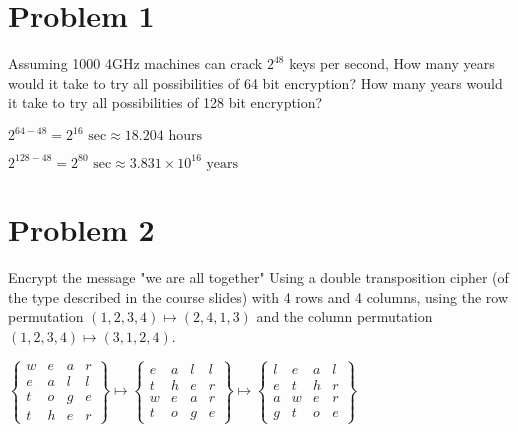 \documentclass{article}
\newenvironment{problem}[1]{
  \nobreak\section*{Problem #1}
}{}
\begin{document}
  \begin{problem}{1}
    Assuming 1000 4GHz machines can crack $2^{48}$ keys per second, How 
    many years would it take to try all possibilities of 64 bit encryption?
    How many years would it take to try all possibilities of 128 bit encryption?
    
    \begin{center}
      \begin{math}
        2^{64-48}=2^{16} \text{ sec} \approx 18.204 \text{ hours}
      \end{math}
    \end{center}
    \begin{center}
      \begin{math}
        2^{128-48}=2^{80} \text{ sec} \approx 3.831 \times 10^{16} \text{ years}
      \end{math}
    \end{center}
  \end{problem}

  \begin{problem}{2}
    Encrypt the message "we are all together" Using a double transposition cipher 
    (of the type described in the course slides) with 4 rows and 4 columns, using 
    the row permutation $(1, 2, 3, 4) \mapsto (2, 4, 1, 3)$ and the column permutation 
    $(1, 2, 3, 4) \mapsto (3, 1, 2, 4)$.

    \begin{center}
      \begin{math}
        \begin{Bmatrix}
          w & e & a & r \\
          e & a & l & l \\
          t & o & g & e \\
          t & h & e & r
        \end{Bmatrix}
        \mapsto
        \begin{Bmatrix}
          e & a & l & l \\
          t & h & e & r \\
          w & e & a & r \\
          t & o & g & e
        \end{Bmatrix}
        \mapsto
        \begin{Bmatrix}
          l & e & a & l \\
          e & t & h & r \\
          a & w & e & r \\
          g & t & o & e
        \end{Bmatrix}
      \end{math}
    \end{center}
  \end{problem}
\end{document}
